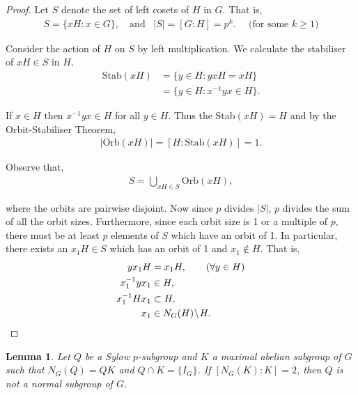 \documentclass[a4paper , 11pt]{book}
\newtheorem{lemma}[theorem]{Lemma}
\theoremstyle{definition}
\theoremstyle{remark}
\begin{document}
\begin{proof} Let $S$ denote the set of left cosets of $H$ in $G$. That is,
\begin{align*} S = \{ x H : x \in G \}, \quad \text{and} \;\;\; |S| = [G : H] = p^k. \quad \text{ (for some $k \geq 1$)}
\end{align*}

Consider the action of $H$ on $S$ by left multiplication. We calculate the stabiliser of $xH \in S$ in $H$.
\begin{align*} \text{Stab}(xH) &= \{ y \in H : yxH = xH \}
\\ &= \{ y \in H : x^{-1}yx \in H \}.
\end{align*}

If $x \in H$ then $x^{-1}yx \in H$ for all $y \in H$. Thus the Stab$(xH) = H$ and by the Orbit-Stabiliser Theorem,
\begin{align*} |\text{Orb}(xH)| = [H : \text{Stab}(xH)] = 1.
\end{align*}

Observe that,
\begin{align*} S = \bigcup\limits_{xH \in S} \text{Orb}(xH),
\end{align*}

where the orbits are pairwise disjoint. Now since $p$ divides $|S|$, $p$ divides the sum of all the orbit sizes. Furthermore, since each orbit size is 1 or a multiple of $p$, there must be at least $p$ elements of $S$ which have an orbit of 1. In particular, there exists an $x_1 H \in S$ which has an orbit of 1 and $x_1 \not \in H$. That is,
\begin{align*} y x_1 H &= x_ 1 H, \tag{$\forall y \in H$}
\\ x_1^{-1} y x_1 &\in H,
\\ x_1^{-1} H x_1 &\subset H,
\\ x_1 &\in N_G(H) \! \setminus \! H. \qedhere
\end{align*} 

\end{proof}

\begin{lemma}\label{caseVlemma}
Let $Q$ be a Sylow $p$-subgroup and $K$ a maximal abelian subgroup of $G$ such that $N_G(Q) = QK$ and $Q \cap K = \{ I_G \}$. If $[N_G(K) : K] = 2$, then $Q$ is not a normal subgroup of $G$.

\end{lemma}
\end{document}
